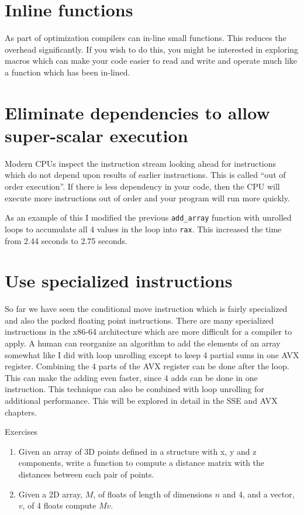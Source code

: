 \documentclass[11pt,b5paper]{book}
\begin{document}
\section{Inline functions}

As part of optimization compilers can in-line small functions.
This reduces the overhead significantly.
If you wish to do this, you might be interested in exploring macros which
can make your code easier to read and write and operate much like a function
which has been in-lined.

\section{Eliminate dependencies to allow super-scalar execution}

Modern CPUs inspect the instruction stream looking ahead for instructions which
do not depend upon results of earlier instructions.
This is called ``out of order execution''.
If there is less dependency in your code, then the CPU will execute more
instructions out of order and your program will run more quickly.

As an example of this I modified the previous {\tt add\_array} function with
unrolled loops to accumulate all 4 values in the loop into {\tt rax}.
This increased the time from 2.44 seconds to 2.75 seconds.

\section{Use specialized instructions}

So far we have seen the conditional move instruction which is fairly
specialized and also the packed floating point instructions.
There are many specialized instructions in the x86-64 architecture which
are more difficult for a compiler to apply.
A human can reorganize an algorithm to add the elements of an array somewhat
like I did with loop unrolling except to keep 4 partial sums in one AVX
register.
Combining the 4 parts of the AVX register can be done after the loop.
This can make the adding even faster, since 4 adds can be done in one instruction.
This technique can also be combined with loop unrolling for additional
performance.
This will be explored in detail in the SSE and AVX chapters.

\vfill
\break
{\large Exercises}

\begin{enumerate}
    \item Given an array of 3D points defined in a structure with x, y and
    z components, write a function to compute a distance matrix with
    the distances between each pair of points.
    \item Given a 2D array, $M$, of floats of length of dimensions $n$ and 4, and
    a vector, $v$, of 4 floats compute $Mv$.
    
\end{enumerate}
\end{document}
